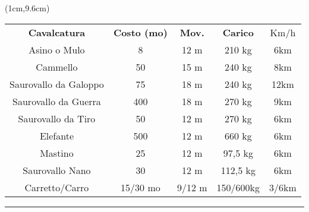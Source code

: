 \documentclass[a4paper,12 pt,openany]{book}
\newcommand{\riga}{\rule{\textwidth}{0.4pt}}
\begin{document}
\begin{textblock*}{12cm}(1cm,9.6cm) %

\begin{tabular}{ccccc}
\hline
\textbf{Cavalcatura}&\textbf{Costo (mo)}&\textbf{Mov.}&\textbf{Carico}&Km/h\\
Asino o Mulo&8&12 m&210 kg&6km\\
Cammello&50&15 m&240 kg&8km\\
Saurovallo da Galoppo&75&18 m&240 kg&12km\\
Saurovallo da Guerra&400&18 m&270 kg&9km\\
Saurovallo da Tiro&50&12 m&270 kg&6km\\
Elefante&500&12 m&660 kg&6km\\
Mastino&25&12 m&97,5 kg&6km\\
Saurovallo Nano&30&12 m&112,5 kg&6km\\
Carretto/Carro    & 15/30 mo & 9/12 m   &150/600kg    & 3/6km              \\
\end{tabular}

\riga





\end{textblock*}
\end{document}
